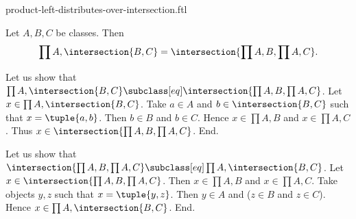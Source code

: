 \documentclass{article}
\begin{document}
\begin{smodule}[creators={Marcel Schütz}]{product-left-distributes-over-intersection.ftl}

  \begin{fproposition*}[label=4188880385343488]
    Let $A, B, C$ be classes.
    Then \[\prod{A,\intersection{B,C}} = \intersection{\prod{A,B},\prod{A,C}}.\]
  \end{fproposition*}
  \begin{fproof}
    Let us show that $\prod{A,\intersection{B,C}} \subclass[eq] \intersection{\prod{A,B},\prod{A,C}}$.
      Let $x \in \prod{A,\intersection{B,C}}$.
      Take $a \in A$ and $b \in \intersection{B,C}$ such that $x = \tuple{a,b}$.
      Then $b \in B$ and $b \in C$.
      Hence $x \in \prod{A,B}$ and $x \in \prod{A,C}$.
      Thus $x \in \intersection{\prod{A,B},\prod{A,C}}$.
    End.

    Let us show that $\intersection{\prod{A,B},\prod{A,C}} \subclass[eq] \prod{A,\intersection{B,C}}$.
      Let $x \in \intersection{\prod{A,B},\prod{A,C}}$.
      Then $x \in \prod{A,B}$ and $x \in \prod{A,C}$.
      Take objects $y, z$ such that $x = \tuple{y,z}$.
      Then $y \in A$ and ($z \in B$ and $z \in C$).
      Hence $x \in \prod{A,\intersection{B,C}}$.
    End.
  \end{fproof}
\end{smodule}
\end{document}
